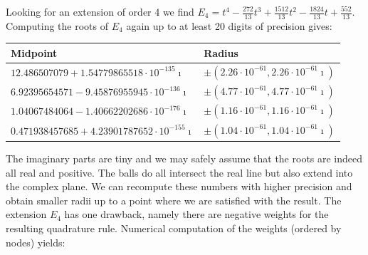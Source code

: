 \documentclass[a4paper,10pt]{article}
\begin{document}
Looking for an extension of order 4 we find
$E_4 = t^4 - \frac{272}{13}t^3 + \frac{1512}{13}t^2 - \frac{1824}{13}t + \frac{552}{13}$.
Computing the roots of $E_4$ again up to at least 20 digits of precision gives:
\begin{center}
  \begin{tabular}{|l|l|}
  \hline
  Midpoint & Radius \\
  \hline
  $12.486507079 + 1.54779865518 \cdot 10^{-135}\imath$   & $\pm (2.26 \cdot 10^{-61}, 2.26 \cdot 10^{-61}\imath)$ \\
  $6.92395654571 - 9.45876955945 \cdot 10^{-136}\imath$  & $\pm (4.77 \cdot 10^{-61}, 4.77 \cdot 10^{-61}\imath)$ \\
  $1.04067484064 - 1.40662202686 \cdot 10^{-176}\imath$  & $\pm (1.16 \cdot 10^{-61}, 1.16 \cdot 10^{-61}\imath)$ \\
  $0.471938457685 + 4.23901787652 \cdot 10^{-155}\imath$ & $\pm (1.04 \cdot 10^{-61}, 1.04 \cdot 10^{-61}\imath)$ \\
  \hline
  \end{tabular}
\end{center}
The imaginary parts are tiny and we may safely assume that the roots are indeed all real
and positive. The balls do all intersect the real line but also extend into the complex plane.
We can recompute these numbers with higher precision and obtain smaller radii up to a point
where we are satisfied with the result.
The extension $E_4$ has one drawback, namely there are negative weights for the resulting
quadrature rule. Numerical computation of the weights (ordered by nodes) yields:
\end{document}
